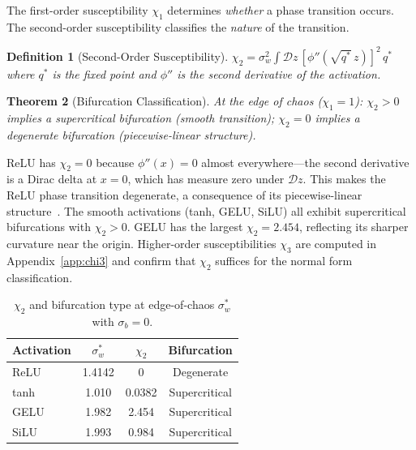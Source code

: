 \documentclass[10pt]{article}
\newtheorem{theorem}{Theorem}
\newtheorem{definition}[theorem]{Definition}
\begin{document}
The first-order susceptibility $\chi_1$ determines \emph{whether} a phase transition occurs.
The second-order susceptibility classifies the \emph{nature} of the transition.

\begin{definition}[Second-Order Susceptibility]
\label{def:chi2}
$\chi_2 = \sigma_w^2 \int \mathcal{D}z\, [\phi''(\sqrt{q^*}\, z)]^2\, q^*$
where $q^*$ is the fixed point and $\phi''$ is the second derivative of the activation.
\end{definition}

\begin{theorem}[Bifurcation Classification]
\label{thm:bifurcation}
At the edge of chaos ($\chi_1 = 1$): $\chi_2 > 0$ implies a supercritical bifurcation (smooth transition); $\chi_2 = 0$ implies a degenerate bifurcation (piecewise-linear structure).
\end{theorem}

ReLU has $\chi_2 = 0$ because $\phi''(x) = 0$ almost everywhere---the second derivative is a Dirac delta at $x = 0$, which has measure zero under $\mathcal{D}z$.
This makes the ReLU phase transition degenerate, a consequence of its piecewise-linear structure~\cite{diBernardo2008piecewise}.
The smooth activations (tanh, GELU, SiLU) all exhibit supercritical bifurcations with $\chi_2 > 0$.
GELU has the largest $\chi_2 = 2.454$, reflecting its sharper curvature near the origin.
Higher-order susceptibilities $\chi_3$ are computed in Appendix~\ref{app:chi3} and confirm that $\chi_2$ suffices for the normal form classification.

\begin{table}[t]
\centering
\caption{$\chi_2$ and bifurcation type at edge-of-chaos $\sigma_w^*$ with $\sigma_b = 0$.}
\label{tab:chi2}
\small
\begin{tabular}{@{}lccc@{}}
\toprule
\textbf{Activation} & $\sigma_w^*$ & $\chi_2$ & \textbf{Bifurcation} \\
\midrule
ReLU  & 1.4142 & 0        & Degenerate \\
tanh  & 1.010  & 0.0382   & Supercritical \\
GELU  & 1.982  & 2.454    & Supercritical \\
SiLU  & 1.993  & 0.984    & Supercritical \\
\bottomrule
\end{tabular}
\end{table}

\end{document}
